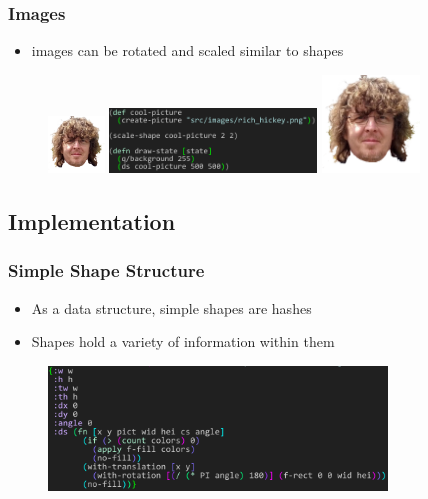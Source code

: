 \documentclass{beamer}
\begin{document}
\begin{frame}
\frametitle{Images}
	\begin{itemize}
		\item images can be rotated and scaled similar to shapes
	\end{itemize}
	\begin{figure}
		\vspace{-0.3cm}
		\includegraphics[width=1.5cm]{PresentationImages/rich_hickey.png}
		\hspace{0.4cm}
		\includegraphics[width=5.5cm]{PresentationImages/pictureCode.png}
		\hspace{0.4cm}
		\includegraphics[width=2.6cm]{PresentationImages/rich_hickey.png}
	\end{figure}

\end{frame}


\subsection{Implementation}

\begin{frame}
\frametitle{Simple Shape Structure}
	\begin{itemize}
		\item As a data structure, simple shapes are hashes
		\item Shapes hold a variety of information within them
	\end{itemize}
	\begin{figure}
		\includegraphics[width=9cm]{PresentationImages/rectHashmap.png}
	\end{figure}
\end{frame}
\end{document}
